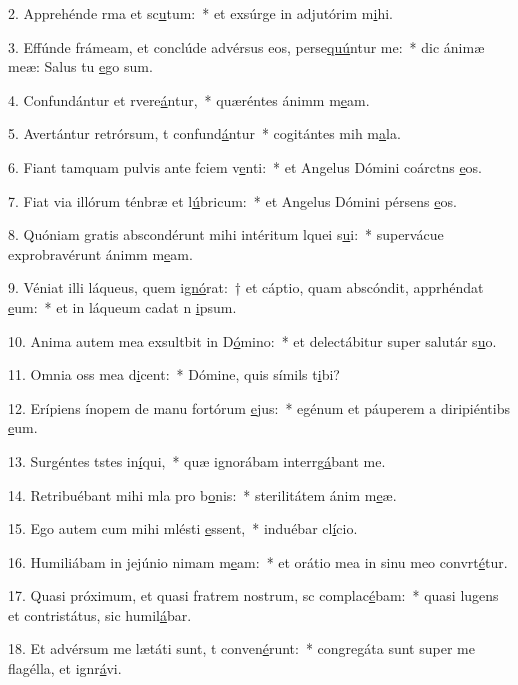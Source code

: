 2. Apprehénde rma et sc\uline{u}tum:~* et exsúrge in adjutórim m\uline{i}hi.\par 
3. Effúnde frámeam, et conclúde advérsus eos,  perse\uline{quú}ntur me:~* dic ánimæ meæ: Salus tu \uline{e}go sum.\par 
4. Confundántur et rvere\uline{á}ntur,~* quæréntes ánimm m\uline{e}am.\par 
5. Avertántur retrórsum, t confund\uline{á}ntur~* cogitántes mih m\uline{a}la.\par 
6. Fiant tamquam pulvis ante fciem v\uline{e}nti:~* et Angelus Dómini coárctns \uline{e}os.\par 
7. Fiat via illórum ténbræ et l\uline{ú}bricum:~* et Angelus Dómini pérsens \uline{e}os.\par 
8. Quóniam gratis abscondérunt mihi intéritum lquei s\uline{u}i:~* supervácue exprobravérunt ánimm m\uline{e}am.\par 
9. Véniat illi láqueus, quem i\uline{gnó}rat:~† et cáptio, quam abscóndit, apprhéndat \uline{e}um:~* et in láqueum cadat n \uline{i}psum.\par 
10. Anima autem mea exsultbit in D\uline{ó}mino:~* et delectábitur super salutár s\uline{u}o.\par 
11. Omnia oss mea d\uline{i}cent:~* Dómine, quis símils t\uline{i}bi?\par 
12. Erípiens ínopem de manu fortórum \uline{e}jus:~* egénum et páuperem a diripiéntibs \uline{e}um.\par 
13. Surgéntes tstes in\uline{í}qui,~* quæ ignorábam interrg\uline{á}bant me.\par 
14. Retribuébant mihi mla pro b\uline{o}nis:~* sterilitátem ánim m\uline{e}æ.\par 
15. Ego autem cum mihi mlésti \uline{e}ssent,~* induébar cl\uline{í}cio.\par 
16. Humiliábam in jejúnio nimam m\uline{e}am:~* et orátio mea in sinu meo convrt\uline{é}tur.\par 
17. Quasi próximum, et quasi fratrem nostrum, sc complac\uline{é}bam:~* quasi lugens et contristátus, sic humil\uline{á}bar.\par 
18. Et advérsum me lætáti sunt, t conven\uline{é}runt:~* congregáta sunt super me flagélla, et ignr\uline{á}vi.\par 
